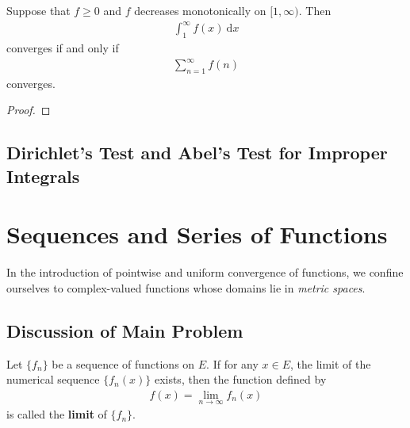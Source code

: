 \documentclass[thmcnt=section, 12pt]{elegantbook}
\begin{document}

\begin{theorem} \label{thm:22}
    Suppose that $f \geq 0$ and $f$ decreases monotonically on $[1, \infty)$. Then 
    \begin{align*}
        \int_1^\infty f(x) \ \mathrm{d}x
    \end{align*}
    converges if and only if 
    \begin{align*}
        \sum_{n=1}^\infty f(n)
    \end{align*}
    converges.
\end{theorem}

\begin{proof}
\end{proof}


\section{Dirichlet's Test and Abel's Test for Improper Integrals}



\chapter{Sequences and Series of Functions}

\par In the introduction of pointwise and uniform convergence of functions, we confine ourselves to complex-valued functions whose domains lie in \textit{metric spaces}.


\section{Discussion of Main Problem}


\begin{definition} \label{def:1}
    Let $\{f_n\}$ be a sequence of functions on $E$. If for any $x \in E$, the limit of the numerical sequence $\{f_n(x)\}$ exists, then the function defined by
    \begin{align*}
        f(x) = \lim_{n \to \infty} f_n(x)
    \end{align*}
    is called the \textbf{limit} of $\{f_n\}$.
\end{definition}
\end{document}
